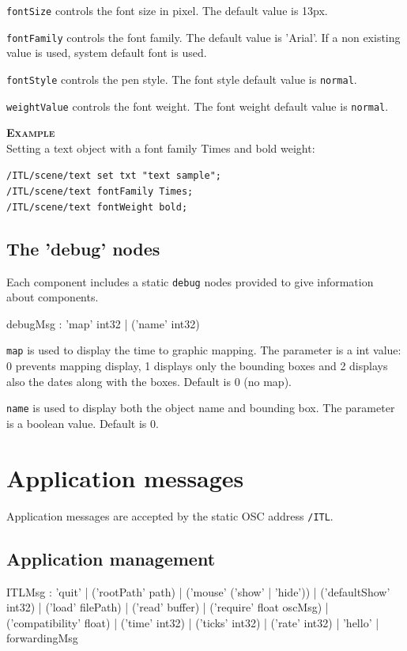 \documentclass[a4paper,twoside]{report}
\newcommand{\toplevel}[1]	{\chapter{#1}}
\newcommand{\sublevel}[1]	{\section{#1}}
\newcommand{\OSC}[1]		{\texttt{#1}}
\newcommand{\example}		{\textbf{\hspace{-1.5cm}\textbf{\textsc{Example }}}}
\let\olditemize\itemize
\let\oldenditemize\enditemize
\renewenvironment{itemize} 	{\olditemize \setlength{\itemsep}{1mm}}{\oldenditemize}
\newcommand{\sample}	[1]			{\vspace{-2mm}\begin{center}\colorbox{mygrey}{
								\begin{minipage}[t]{0.9\columnwidth} 
								{\small \texttt{#1}}
								\end{minipage}}\end{center}}
\begin{document}
\begin{itemize}
\item \OSC{fontSize} controls the font size in pixel. The default value is 13px.
\item \OSC{fontFamily} controls the font family. The default value is 'Arial'. If a non existing value is used, system default font is used.
\item \OSC{fontStyle} controls the pen style. The font style default value is \OSC{normal}.\\
\item \OSC{weightValue} controls the font weight. The font weight default value is \OSC{normal}.
\end{itemize}

\example \\
Setting a text object with a font family Times and bold weight:
\sample{/ITL/scene/text set txt "text sample";\\
/ITL/scene/text fontFamily Times;\\
/ITL/scene/text fontWeight bold;  
}


\sublevel{The 'debug' nodes}
\label{debugnode}

Each component includes a static \OSC{debug} nodes provided to give information about components.
\begin{rail}
debugMsg : 'map' int32
		| ('name' int32) 
\end{rail}

\begin{itemize}
\item \OSC{map} is used to display the time to graphic mapping. The parameter is a int value: 0 prevents mapping display, 1 displays only the bounding boxes and 2 displays also the dates along with the boxes. Default is 0 (no map).
\item \OSC{name} is used to display both the object name and bounding box. The parameter is a boolean value. Default is 0.
\end{itemize}


\toplevel{Application messages}
\label{ITL}
Application messages are accepted by the static OSC address \OSC{/ITL}. 


\sublevel{Application management}
\label{applmgmt}

\begin{rail}
ITLMsg : 'quit' 
		| ('rootPath' path) 
		| ('mouse' ('show' | 'hide'))
		| ('defaultShow' int32)
		| ('load' filePath)
		| ('read' buffer)
		| ('require' float oscMsg)
		| ('compatibility' float)
		| ('time' int32)
		| ('ticks' int32)
		| ('rate' int32)
		| 'hello'
		| forwardingMsg
\end{rail}
\end{document}

